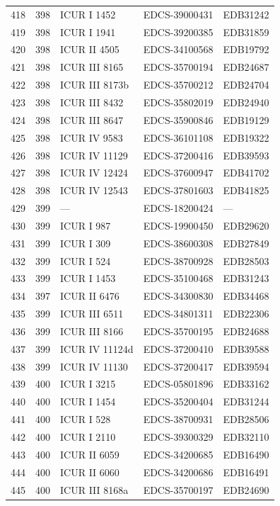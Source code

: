 \begin{longtable}{@{}r r l l l@{}}
418 & 398 & ICUR I 1452 & EDCS-39000431 & EDB31242 \\
419 & 398 & ICUR I 1941 & EDCS-39200385 & EDB31859 \\
420 & 398 & ICUR II 4505 & EDCS-34100568 & EDB19792 \\
421 & 398 & ICUR III 8165 & EDCS-35700194 & EDB24687 \\
422 & 398 & ICUR III 8173b & EDCS-35700212 & EDB24704 \\
423 & 398 & ICUR III 8432 & EDCS-35802019 & EDB24940 \\
424 & 398 & ICUR III 8647 & EDCS-35900846 & EDB19129 \\
425 & 398 & ICUR IV 9583 & EDCS-36101108 & EDB19322 \\
426 & 398 & ICUR IV 11129 & EDCS-37200416 & EDB39593 \\
427 & 398 & ICUR IV 12424 & EDCS-37600947 & EDB41702 \\
428 & 398 & ICUR IV 12543 & EDCS-37801603 & EDB41825 \\
429 & 399 & — & EDCS-18200424 & — \\
430 & 399 & ICUR I 987 & EDCS-19900450 & EDB29620 \\
431 & 399 & ICUR I 309 & EDCS-38600308 & EDB27849 \\
432 & 399 & ICUR I 524 & EDCS-38700928 & EDB28503 \\
433 & 399 & ICUR I 1453 & EDCS-35100468 & EDB31243 \\
434 & 397 & ICUR II 6476 & EDCS-34300830 & EDB34468 \\
435 & 399 & ICUR III 6511 & EDCS-34801311 & EDB22306 \\
436 & 399 & ICUR III 8166 & EDCS-35700195 & EDB24688 \\
437 & 399 & ICUR IV 11124d & EDCS-37200410 & EDB39588 \\
438 & 399 & ICUR IV 11130 & EDCS-37200417 & EDB39594 \\
439 & 400 & ICUR I 3215 & EDCS-05801896 & EDB33162 \\
440 & 400 & ICUR I 1454 & EDCS-35200404 & EDB31244 \\
441 & 400 & ICUR I 528 & EDCS-38700931 & EDB28506 \\
442 & 400 & ICUR I 2110 & EDCS-39300329 & EDB32110 \\
443 & 400 & ICUR II 6059 & EDCS-34200685 & EDB16490 \\
444 & 400 & ICUR II 6060 & EDCS-34200686 & EDB16491 \\
445 & 400 & ICUR III 8168a & EDCS-35700197 & EDB24690 \\

\end{longtable}
